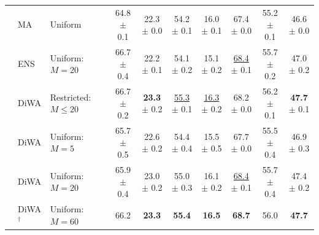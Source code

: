 \begin{table}[h]
{\begin{tabular}{llll|ccccccc}
             & MA \cite{arpit2021ensemble}                        & Uniform                   &                                                & 64.8 $\pm$ 0.1             & 22.3 $\pm$ 0.0          & 54.2 $\pm$ 0.1             & 16.0 $\pm$ 0.1             & 67.4 $\pm$ 0.0             & 55.2 $\pm$ 0.1             & 46.6 $\pm$ 0.0          \\
             & ENS                                                & Uniform: $M=20$           &                                                & 66.7 $\pm$ 0.4             & 22.2 $\pm$ 0.1          & 54.1 $\pm$ 0.2             & 15.1 $\pm$ 0.2             & \underline{68.4} $\pm$ 0.1 & 55.7 $\pm$ 0.2             & 47.0 $\pm$ 0.2          \\
             & DiWA                                               & Restricted: $M \leq 20$   &                                                & 66.7 $\pm$ 0.2             & \textbf{23.3} $\pm$ 0.2 & \underline{55.3} $\pm$ 0.1 & \underline{16.3} $\pm$ 0.2 & 68.2 $\pm$ 0.0             & 56.2 $\pm$ 0.1             & \textbf{47.7} $\pm$ 0.1 \\
             & DiWA                                               & Uniform: $M=5$            &                                                & 65.7 $\pm$ 0.5             & 22.6 $\pm$ 0.2          & 54.4 $\pm$ 0.4             & 15.5 $\pm$ 0.5             & 67.7 $\pm$ 0.0             & 55.5 $\pm$ 0.4             & 46.9 $\pm$ 0.3          \\
             & DiWA                                               & Uniform: $M=20$           &                                                & 65.9 $\pm$ 0.4             & 23.0 $\pm$ 0.2          & 55.0 $\pm$ 0.3             & 16.1 $\pm$ 0.2             & \underline{68.4} $\pm$ 0.1 & 55.7 $\pm$ 0.4             & 47.4 $\pm$ 0.2          \\
             & DiWA$^{\dagger}$                                   & Uniform: $M=60$           &                                                & 66.2                       & \textbf{23.3}           & \textbf{55.4}              & \textbf{16.5}              & \textbf{68.7}              & 56.0                       & \textbf{47.7}           \\
            \bottomrule
        \end{tabular}}
\end{table}



